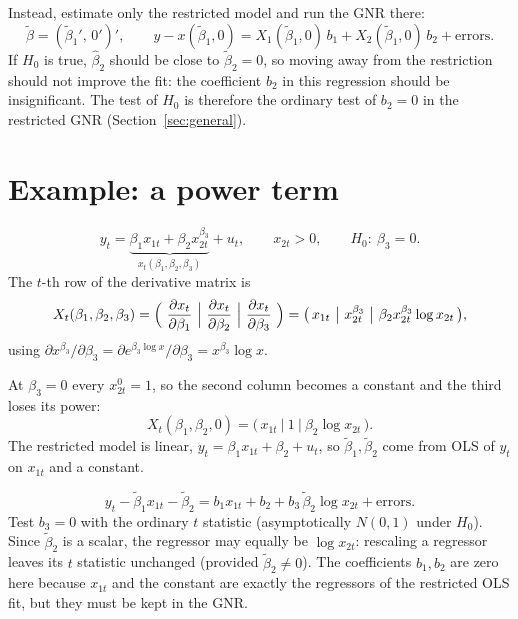 \documentclass[11pt]{article}
\begin{document}
Instead, estimate only the restricted model and run the GNR there:
\[ \tilde\beta=(\tilde\beta_{1}',\,0')', \qquad
   y-x(\tilde\beta_{1},0)=X_{1}(\tilde\beta_{1},0)\,b_{1}
   +X_{2}(\tilde\beta_{1},0)\,b_{2}+\text{errors}. \]
If $H_{0}$ is true, $\hat\beta_{2}$ should be close to $\tilde\beta_{2}=0$, so
moving away from the restriction should not improve the fit: the coefficient
$b_{2}$ in this regression should be insignificant. The test of $H_{0}$ is
therefore the ordinary test of $b_{2}=0$ in the restricted GNR (Section~\ref{sec:general}).

\section{Example: a power term}

\[ y_{t}=\underbrace{\beta_{1}x_{1t}+\beta_{2}x_{2t}^{\beta_{3}}}_{x_{t}(\beta_{1},\beta_{2},\beta_{3})}+u_{t},
   \qquad x_{2t}>0, \qquad H_{0}:\ \beta_{3}=0. \]
The $t$-th row of the derivative matrix is
\[ X_{t}(\beta_{1},\beta_{2},\beta_{3})
   =\Bigl(\ \frac{\partial x_{t}}{\partial\beta_{1}}\ \Big|\
            \frac{\partial x_{t}}{\partial\beta_{2}}\ \Big|\
            \frac{\partial x_{t}}{\partial\beta_{3}}\ \Bigr)
   =\bigl(\,x_{1t}\ \big|\ x_{2t}^{\beta_{3}}\ \big|\ \beta_{2}x_{2t}^{\beta_{3}}\log x_{2t}\,\bigr), \]
using $\partial x^{\beta_{3}}/\partial\beta_{3}
=\partial e^{\beta_{3}\log x}/\partial\beta_{3}=x^{\beta_{3}}\log x$.

\topic{Under $H_{0}$}
At $\beta_{3}=0$ every $x_{2t}^{0}=1$, so the second column becomes a constant
and the third loses its power:
\[ X_{t}(\beta_{1},\beta_{2},0)=\bigl(\,x_{1t}\ \big|\ 1\ \big|\ \beta_{2}\log x_{2t}\,\bigr). \]
The restricted model is linear, $y_{t}=\beta_{1}x_{1t}+\beta_{2}+u_{t}$, so
$\tilde\beta_{1},\tilde\beta_{2}$ come from OLS of $y_{t}$ on $x_{1t}$ and a constant.

\topic{The GNR}
\[ y_{t}-\tilde\beta_{1}x_{1t}-\tilde\beta_{2}
   = b_{1}x_{1t}+b_{2}+b_{3}\,\tilde\beta_{2}\log x_{2t}+\text{errors}. \]
Test $b_{3}=0$ with the ordinary $t$ statistic (asymptotically $N(0,1)$ under $H_{0}$).
Since $\tilde\beta_{2}$ is a scalar, the regressor may equally be $\log x_{2t}$:
rescaling a regressor leaves its $t$ statistic unchanged (provided $\tilde\beta_{2}\neq0$).
The coefficients $b_{1},b_{2}$ are zero here because $x_{1t}$ and the constant are
exactly the regressors of the restricted OLS fit, but they must be kept in the GNR.
\end{document}
